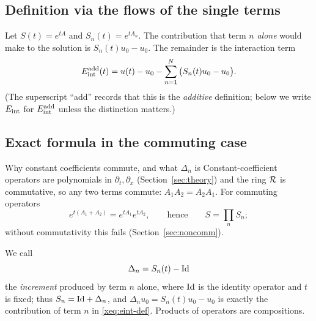 \subsection{Definition via the flows of the single terms}
Let $S(t)=e^{tA}$ and $S_n(t)=e^{tA_n}$. The contribution that term $n$ \emph{alone} would make to the solution is $S_n(t)u_0-u_0$. The remainder is the interaction term
\begin{equation}\label{xeq:eint-def}
E_{\mathrm{int}}^{\mathrm{add}}(t)=u(t)-u_0-\sum_{n=1}^N\big(S_n(t)u_0-u_0\big).
\end{equation}
(The superscript ``add'' records that this is the \emph{additive} definition; below we write $E_{\mathrm{int}}$ for $E_{\mathrm{int}}^{\mathrm{add}}$ unless the distinction matters.)

\subsection{Exact formula in the commuting case}
\begin{aside}{Why constant coefficients commute, and what $\Delta_n$ is}
Constant-coefficient operators are polynomials in $\partial_t,\partial_x$ (Section~\ref{sec:theory}) and the ring $\mathcal{R}$ is commutative, so any two terms commute: $A_1A_2=A_2A_1$. For commuting operators
\[
e^{t(A_1+A_2)}=e^{tA_1}e^{tA_2},\qquad\text{hence}\qquad S=\prod_nS_n;
\]
without commutativity this fails (Section~\ref{sec:noncomm}).

We call
\[
\Delta_n=S_n(t)-\mathrm{Id}
\]
the \emph{increment} produced by term $n$ alone, where $\mathrm{Id}$ is the identity operator and $t$ is fixed; thus $S_n=\mathrm{Id}+\Delta_n$, and $\Delta_nu_0=S_n(t)u_0-u_0$ is exactly the contribution of term $n$ in \eqref{xeq:eint-def}. Products of operators are compositions.
\end{aside}

